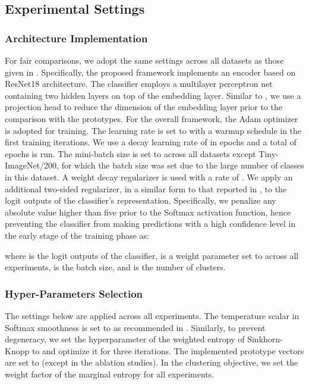 \documentclass[journal]{IEEEtran}
\begin{document}
\subsection{Experimental Settings}

\subsubsection{Architecture Implementation} 
For fair comparisons, we adopt the same settings across all datasets as those given in \cite{caron2020unsupervised,pmlr-v119-chen20j}. Specifically, the proposed framework implements an encoder based on ResNet18 \cite{he2015deep} architecture. The classifier employs a multilayer perceptron net containing two hidden layers on top of the embedding layer. Similar to  \cite{caron2020unsupervised,pmlr-v119-chen20j}, we use a projection head to reduce the dimension of the embedding layer prior to the comparison with the prototypes. For the overall framework, the Adam optimizer \cite{DBLP:journals/corr/KingmaB14} is adopted for training. The learning rate is set to  with a warmup schedule in the first  training iterations. We use a decay learning rate of  in epochs  and a total of  epochs is run. The mini-batch size is set to  across all datasets except Tiny-ImageNet/200, for which the batch size was set  due to the large number of classes in this dataset. A  weight decay regularizer is used with a rate of . We apply an additional two-sided regularizer, in a similar form to that reported in \cite{NEURIPS2019_ddf35421,NEURIPS2020_f3ada80d}, to the logit outputs of the classifier's representation. Specifically, we penalize any absolute value higher than five prior to the Softmax activation function, hence preventing the classifier from making predictions with a high confidence level in the early stage of the training phase as:

where  is the logit outputs of the classifier,   is a weight parameter set to  across all experiments,  is the batch size, and  is the number of clusters.

\subsubsection{Hyper-Parameters Selection} 
The settings below are applied across all experiments. The temperature scalar  in Softmax smoothness is set to  as recommended in \cite{caron2020unsupervised}. Similarly, to prevent degeneracy, we set the hyperparameter  of the weighted entropy of Sinkhorn-Knopp to  and optimize it for three iterations. The implemented prototype vectors are set to  (except in the ablation studies). In the clustering objective, we set the weight factor of the marginal entropy  for all experiments.
\end{document}
